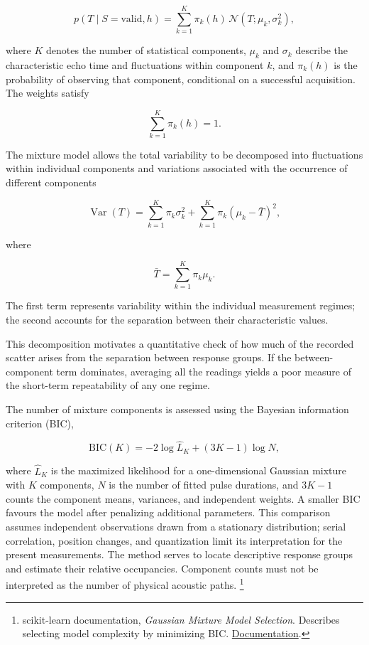 \documentclass[11pt,a4paper]{article}
\begin{document}
\[
p(T\mid S=\mathrm{valid},h)
=
\sum_{k=1}^{K}
\pi_k(h)\,
\mathcal N(T;\mu_k,\sigma_k^2),
\]

where \(K\) denotes the number of statistical components, \(\mu_k\) and \(\sigma_k\) describe the characteristic echo time and fluctuations within component \(k\), and \(\pi_k(h)\) is the probability of observing that component, conditional on a successful acquisition. The weights satisfy

\[
\sum_{k=1}^{K}\pi_k(h)=1.
\]

The mixture model allows the total variability to be decomposed into fluctuations within individual components and variations associated with the occurrence of different components

\[
\operatorname{Var}(T) = \sum_{k=1}^{K}\pi_k\sigma_k^2 + \sum_{k=1}^{K}\pi_k(\mu_k-\bar T)^2,
\]

where

\[
\bar T=\sum_{k=1}^{K}\pi_k\mu_k.
\]

The first term represents variability within the individual measurement regimes; the second accounts for the separation between their characteristic values.

This decomposition motivates a quantitative check of how much of the recorded scatter arises from the separation between response groups. If the between-component term dominates, averaging all the readings yields a poor measure of the short-term repeatability of any one regime.

The number of mixture components is assessed using the Bayesian information criterion (BIC),

\[
\mathrm{BIC}(K)=-2\log\hat L_K+(3K-1)\log N,
\]

where \(\hat L_K\) is the maximized likelihood for a one-dimensional Gaussian mixture with \(K\) components, \(N\) is the number of fitted pulse durations, and \(3K-1\) counts the component means, variances, and independent weights. A smaller BIC favours the model after penalizing additional parameters. This comparison assumes independent observations drawn from a stationary distribution; serial correlation, position changes, and quantization limit its interpretation for the present measurements. The method serves to locate descriptive response groups and estimate their relative occupancies. Component counts must not be interpreted as the number of physical acoustic paths. \footnote{scikit-learn documentation, \emph{Gaussian Mixture Model Selection}. Describes selecting model complexity by minimizing BIC. \href{https://scikit-learn.org/stable/auto\_examples/mixture/plot\_gmm\_selection.html}{Documentation}.}
\end{document}
